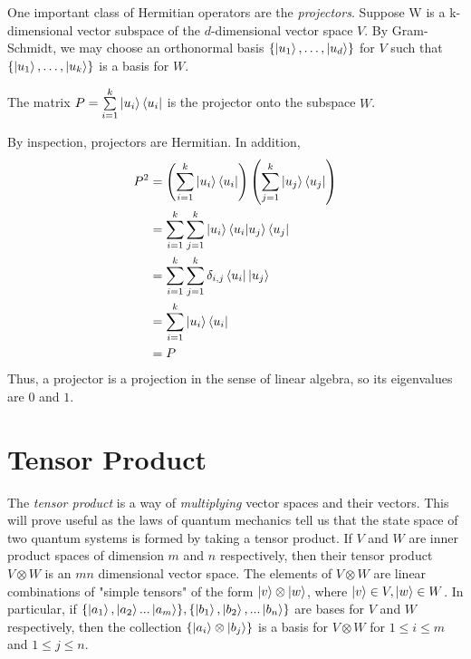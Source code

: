 One important class of Hermitian operators are the \textit{projectors}. Suppose W is a k-dimensional vector subspace of the $d$-dimensional vector space $V$. By Gram-Schmidt, we may choose an orthonormal basis $\{\ket{u_1}, \hdots, \ket{u_d}\}$ for $V$ such that $\{\ket{u_1}, \hdots, \ket{u_k}\}$ is a basis for $W$.  
\begin{definition}
The matrix $P=\sum\limits_{i=1}^k \ket{u_i} \bra{u_i}$ is the projector onto the subspace $W$.
\end{definition}
By inspection, projectors are Hermitian.  In addition,
\begin{align}
    P^2&=\left(\sum_{i=1}^k \ket{u_i} \bra{u_i}\right)\left(\sum_{j=1}^k \ket{u_j} \bra{u_j}\right)\\
    &=\sum_{i=1}^k \sum_{j=1}^k \ket{u_i} \braket{u_i|u_j} \bra{u_j}\\
    &=\sum_{i=1}^k \sum_{j=1}^k\delta_{i,j}\bra{u_i}\ket{u_j}\\
    &=\sum_{i=1}^k \ket{u_i} \bra{u_i}\\
    &=P \label{eqn: projectors square to themselves}
\end{align}
Thus, a projector is a projection in the sense of linear algebra, so its eigenvalues are $0$ and $1$.


\pagebreak
\section{Tensor Product}

The \textit{tensor product} is a way of {\emph{multiplying}} vector spaces and their vectors. This will prove useful as the laws of quantum mechanics tell us that the state space of two quantum systems is formed by taking a tensor product. If $V$ and $W$ are inner product spaces of dimension $m$ and $n$ respectively, then their tensor product $V \otimes W$ is an $mn$ dimensional vector space. The elements of $V \otimes W$ are linear combinations of "simple tensors" of the form $\ket{v} \otimes \ket{w}$, where $\ket{v} \in V, \ket{w} \in W$. In particular, if $\{\ket{a_1}, \ket{a_2}...\ket{a_m}\}, \{\ket{b_1},\ket{b_2}, ...\ket{b_n}\}$ are bases for $V$ and $W$ respectively, then the collection $\{\ket{a_i}\otimes\ket{b_j}\}$ is a basis for $V \otimes W$ for $1\leq i \leq m$ and $1 \leq j \leq n$.


